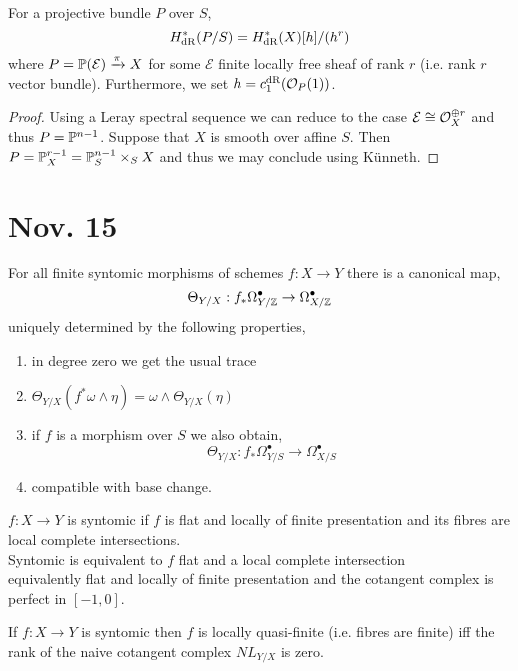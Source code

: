 \documentclass[12pt]{article}
\begin{document}
\begin{proposition}
For a projective bundle $P$ over $S$,
\[ H^*_{\dR}(P / S) = H^*_{\dR}(X)[h] / (h^r) \]
where $P = \P(\mathcal{E}) \xrightarrow{\pi} X$ for some $\mathcal{E}$ finite locally free sheaf of rank $r$ (i.e. rank $r$ vector bundle). Furthermore, we set $h = c_1^{\dR}(\struct{P}(1))$. 
\end{proposition}

\begin{proof}
Using a Leray spectral sequence we can reduce to the case $\mathcal{E} \cong \struct{X}^{\oplus r}$ and thus $P = \P^{n - 1}$. Suppose that $X$ is smooth over affine $S$. Then $P = \P_X^{r - 1} = \P_S^{n-1} \times_S X$ and thus we may conclude using K\"{u}nneth. 
\end{proof}

\section{Nov. 15}


\begin{proposition}
For all finite syntomic morphisms of schemes $f : X \to Y$ there is a canonical map,
\[ \Theta_{Y / X} : f_* \Omega^\bullet_{Y / \Z} \to \Omega^\bullet_{X / \Z} \]
uniquely determined by the following properties,
\begin{enumerate}
\item in degree zero we get the usual trace
\item $\Theta_{Y/X}(f^* \omega \wedge \eta) = \omega \wedge \Theta_{Y / X}(\eta)$
\item if $f$ is a morphism over $S$ we also obtain,
\[ \Theta_{Y / X} : f_* \Omega^\bullet_{Y/S} \to \Omega^\bullet_{X / S} \]
\item compatible with base change.
\end{enumerate}
\end{proposition}

\begin{definition}
$f : X \to Y$ is syntomic if $f$ is flat and locally of finite presentation and its fibres are local complete intersections. 
\bigskip\\
Syntomic is equivalent to $f$ flat and a local complete intersection 
\bigskip\\
equivalently flat and locally of finite presentation and the cotangent complex is perfect in $[-1,0]$.
\end{definition}

\begin{remark}
If $f : X \to Y$ is syntomic then $f$ is locally quasi-finite (i.e. fibres are finite) iff the rank of the naive cotangent complex $NL_{Y / X}$ is zero.
\end{remark}
\end{document}
